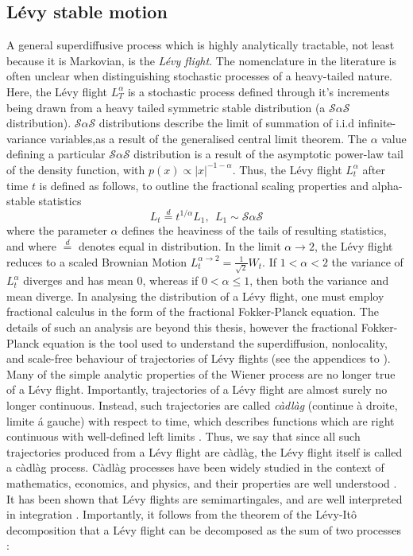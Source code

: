 \subsection{Lévy stable motion}\label{subsec:levy_motion}
A general superdiffusive process which is highly analytically tractable, not least because it is Markovian, is the \textit{Lévy flight}. The nomenclature in the literature is often unclear when distinguishing stochastic processes of a heavy-tailed nature. Here, the Lévy flight $L_T^{\alpha}$ is a stochastic process defined through it's increments being drawn from a heavy tailed symmetric stable distribution (a $\mathcal{S}\alpha\mathcal{S}$ distribution). $\mathcal{S}\alpha\mathcal{S}$ distributions describe the limit of summation of i.i.d infinite-variance variables,as a result of the generalised central limit theorem. The $\alpha$ value defining a particular $\mathcal{S}\alpha\mathcal{S}$ distribution is a result of the asymptotic power-law tail of the density function, with $p(x) \propto |x|^{-1-\alpha}$. Thus, the Lévy flight $L_t^{\alpha}$ after time $t$ is defined as follows, to outline the fractional scaling properties and alpha-stable statistics
\begin{equation}
	L_t \stackrel{d}{=} t^{1/\alpha} L_1, \ \ L_1 \sim \mathcal{S}\alpha\mathcal{S}
\end{equation}
where the parameter $\alpha$ defines the heaviness of the tails of resulting statistics, and where $\stackrel{d}{=}$ denotes equal in distribution. In the limit $\alpha \rightarrow 2$, the Lévy flight reduces to a scaled Brownian Motion $L_t^{\alpha \rightarrow 2} = \frac{1}{\sqrt{2}}W_t$. If $1 < \alpha < 2$ the variance of $L_t^{\alpha}$ diverges and has mean 0, whereas if $0 < \alpha \leq 1$, then both the variance and mean diverge. In analysing the distribution of a Lévy flight, one must employ fractional calculus in the form of the fractional Fokker-Planck equation. The details of such an analysis are beyond this thesis, however the fractional Fokker-Planck equation is the tool used to understand the superdiffusion,  nonlocality, and scale-free behaviour of trajectories of Lévy flights (see the appendices to \cite{qi_fractional_2022}). Many of the simple analytic properties of the Wiener process are no longer true of a Lévy flight. Importantly, trajectories of a Lévy flight are almost surely no longer continuous. Instead, such trajectories are called \textit{càdlàg} (continue à droite, limite á gauche) with respect to time, which describes functions which are right continuous with well-defined left limits \cite{van_den_Bosch}. Thus, we say that since all such trajectories produced from a Lévy flight are càdlàg, the Lévy flight itself is called a càdlàg process. Càdlàg processes have been widely studied in the context of mathematics, economics, and physics, and their properties are well understood \cite{soulier2022-ge, Borkar1995}. It has been shown that Lévy flights are semimartingales, and are well interpreted in integration \cite{van_den_Bosch}. Importantly, it follows from the theorem of the Lévy-Itô decomposition that a Lévy flight can be decomposed as the sum of two processes \cite{Kyprianou2014}:
